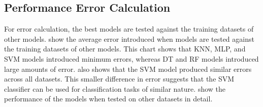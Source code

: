\subsection{Performance Error Calculation}
For error calculation, the best models are tested against the training datasets of other models.  show the average error introduced when models are tested against the training datasets of other models. This chart shows that KNN, MLP, and SVM models introduced minimum errors, whereas DT and RF models introduced large amounts of error.  also shows that the SVM model produced similar errors across all datasets. This smaller difference in error suggests that the SVM classifier can be used for classification tasks of similar nature. {\responsemod {} show the performance of the models when tested on other datasets in detail.}
